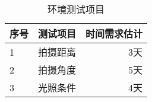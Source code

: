 \begin{table}[!h]
\centering
    \begin{center}
    \begin{tabular}{llr}
    \toprule
    序号      & 测试项目                         & 时间需求估计 \\
    \midrule
    1         & 拍摄距离                         & 3天          \\
    2         & 拍摄角度                         & 5天          \\
    3         & 光照条件                         & 4天          \\
    \bottomrule
    \end{tabular}
    \end{center}
    \caption{环境测试项目}
    \label{tab:env_test}
\end{table}

\clearpage
